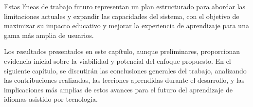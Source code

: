 Estas líneas de trabajo futuro representan un plan estructurado para abordar las limitaciones actuales y expandir las capacidades del sistema, con el objetivo de maximizar su impacto educativo y mejorar la experiencia de aprendizaje para una gama más amplia de usuarios.

Los resultados presentados en este capítulo, aunque preliminares, proporcionan evidencia inicial sobre la viabilidad y potencial del enfoque propuesto. En el siguiente capítulo, se discutirán las conclusiones generales del trabajo, analizando las contribuciones realizadas, las lecciones aprendidas durante el desarrollo, y las implicaciones más amplias de estos avances para el futuro del aprendizaje de idiomas asistido por tecnología.